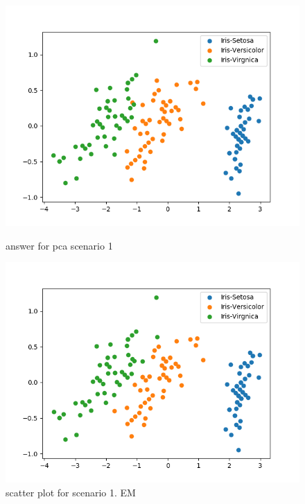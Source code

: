 \documentclass[a4paper]{article}
\begin{document}
          \begin{figure}[h!]
            \centering
            \begin{minipage}[t]{6.5cm}
              \includegraphics[width=1.0\textwidth]{pca_em_1_ans.png}
              \caption{answer for pca scenario 1}
            \end{minipage}
            \hspace{2cm}
            \begin{minipage}[t]{6.5cm}
              \includegraphics[width=1.0\textwidth]{pca_em_1_1.png}
              \caption{scatter plot for scenario 1. EM}
            \end{minipage}
            \begin{minipage}[t]{6.5cm}

\end{minipage}
\end{figure}
\end{document}

